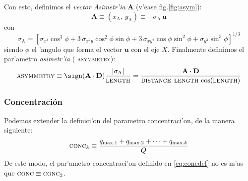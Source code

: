 %
Con esto, definimos el \emph{vector Asimetr'ia} $\mathbf{A}$ (v'ease
fig.\ref{fig:asym}):
%
\begin{equation}
  \label{eq:asymmetryvec}
  \mathbf{A} \equiv (x_{\mathrm{A}},\, y_{\mathrm{A}}) 
  \equiv -\sigma_{\mathrm{A}}\,\mathbf{u}
\end{equation}
%
con
%
\begin{equation}
  \label{eq:sigmaA}
  \sigma_{\mathrm{A}} = \left[
    \sigma_{x^3}\cos^3\phi +
    3\, \sigma_{x^2 y}\cos^2\phi\sin\phi +
    3\, \sigma_{x y^2}\cos\phi\sin^2\phi +
    \sigma_{y^3}\sin^3\phi\right]^{1/3}
\end{equation}
%
siendo $\phi$ el 'angulo que forma el vector $\mathbf{u}$ con el eje
$X$. Finalmente definimos el par'ametro \emph{asimetr'ia} ({\scshape
  asymmetry}):
%
\begin{equation}
  \label{eq:asymmetry}
  \text{\scshape asymmetry} \equiv
  \sign(\mathbf{A}\cdot\mathbf{D})
  \frac{|\sigma_{\mathrm{A}}|}{\text{\scshape length}} =
  \frac{\mathbf{A}\cdot\mathbf{D}}{\text{\scshape distance}\mspace{8mu}
    \text{\scshape length}\,\cos(\text{\scshape length})}
\end{equation}

\subsubsection*{Concentraci\'on}
%
Podemos extender la definici'on del parametro concentraci'on, de la
manera siguiente:
%
\begin{equation}
  \label{eq:conck}
  \text{\scshape conc}_k \equiv
  \frac{q_{\mathrm{max.1}} + q_{\mathrm{max.2}} + \cdots 
    + q_{\mathrm{max.}k}}{Q}
\end{equation}
%
De este modo, el par'ametro concentraci'on definido en
\eqref{eq:concdef} no es m'as que $\text{\scshape conc} \equiv
\text{\scshape conc}_2$.

\clearpage

\asymfig

\mbox{}

\endinput
%

